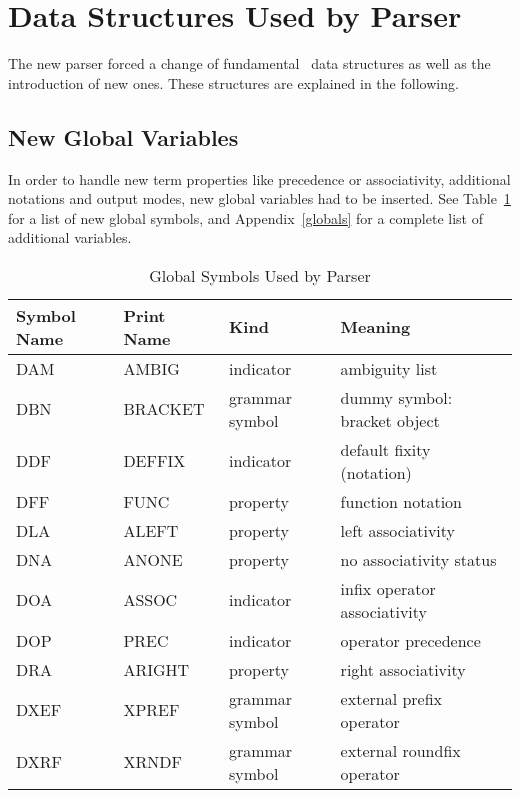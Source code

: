 \section{Data Structures Used by Parser}

The new parser forced a change of fundamental \redux\ data structures
as well as the introduction of new ones. 
These structures are explained in the following.

\subsection{New Global Variables}
In order to handle new term properties like precedence or associativity,
additional notations and output modes, new global variables had to be
inserted.
See Table~\ref{globsym} for a list of new global symbols, and 
Appendix~\ref{globals} for a complete list of additional variables.

\begin{table}[htbp]
\begin{center}
\begin{tabular}{|l|l|l|l|}
\hline
Symbol Name & Print Name & Kind & Meaning \\
\hline \hline
DAM & AMBIG & indicator & ambiguity list \\ \hline
DBN & BRACKET & grammar symbol & dummy symbol: bracket object \\ \hline
DDF & DEFFIX & indicator & default fixity (notation) \\ \hline
DFF & FUNC & property & function notation \\ \hline
DLA & ALEFT & property & left associativity \\ \hline
DNA & ANONE & property & no associativity status \\ \hline
DOA & ASSOC & indicator & infix operator associativity \\ \hline
DOP & PREC & indicator & operator precedence \\ \hline
DRA & ARIGHT & property & right associativity \\ \hline
DXEF & XPREF & grammar symbol & external prefix operator \\ \hline
DXRF & XRNDF & grammar symbol & external roundfix operator \\ \hline
\end{tabular}
\end{center}
\caption{Global Symbols Used by Parser}
\label{globsym}
\end{table}

